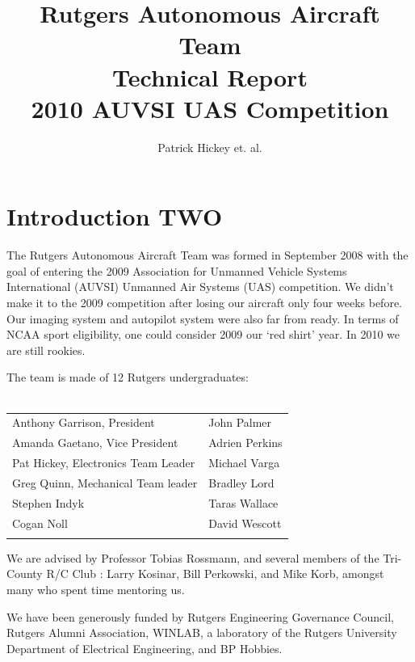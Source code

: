 \documentclass[10pt]{report}
\begin{document}
\title{Rutgers Autonomous Aircraft Team\\Technical Report\\2010 AUVSI UAS Competition}
\author{Patrick Hickey et. al.}



\section{Introduction TWO}

The Rutgers Autonomous Aircraft Team was formed in September 2008 with the goal of entering the 2009 Association for Unmanned Vehicle Systems International (AUVSI)\cite{auvsiweb} Unmanned Air Systems (UAS) competition\cite{uasweb}. We didn't make it to the 2009 competition after losing our aircraft only four weeks before. Our imaging system and autopilot system were also far from ready. In terms of NCAA sport eligibility, one could consider 2009 our `red shirt' year. In 2010 we are still rookies.

The team is made of 12 Rutgers undergraduates:\\
\\ \begin{tabular}{l l}
Anthony Garrison, President & John Palmer \\
Amanda Gaetano, Vice President & Adrien Perkins\\
Pat Hickey, Electronics Team Leader & Michael Varga\\
Greg Quinn, Mechanical Team leader & Bradley Lord\\
Stephen Indyk & Taras Wallace\\ 
Cogan Noll & David Wescott\\ \\
\end{tabular}

We are advised by
 Professor Tobias Rossmann,
 and several members of the Tri-County R/C Club \cite{tricountyRC}:
 Larry Kosinar,
 Bill Perkowski,
and  Mike Korb, 
amongst many who spent time mentoring us.

We have been generously funded by 
Rutgers Engineering Governance Council,
Rutgers Alumni Association,
WINLAB, a laboratory of the Rutgers University Department of Electrical Engineering, 
and BP Hobbies. 
\end{document}
